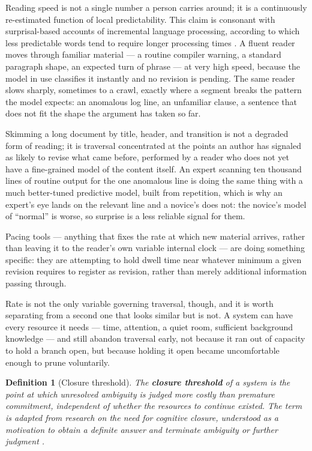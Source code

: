 \documentclass[11pt]{article}
\newtheorem{definition}{Definition}
\begin{document}
Reading speed is not a single number a person carries around; it is a continuously re-estimated function of local predictability. This claim is consonant with surprisal-based accounts of incremental language processing, according to which less predictable words tend to require longer processing times \citep{levy2008,wilcoxetal2023}. A fluent reader moves through familiar material --- a routine compiler warning, a standard paragraph shape, an expected turn of phrase --- at very high speed, because the model in use classifies it instantly and no revision is pending. The same reader slows sharply, sometimes to a crawl, exactly where a segment breaks the pattern the model expects: an anomalous log line, an unfamiliar clause, a sentence that does not fit the shape the argument has taken so far.

Skimming a long document by title, header, and transition is not a degraded form of reading; it is traversal concentrated at the points an author has signaled as likely to revise what came before, performed by a reader who does not yet have a fine-grained model of the content itself. An expert scanning ten thousand lines of routine output for the one anomalous line is doing the same thing with a much better-tuned predictive model, built from repetition, which is why an expert's eye lands on the relevant line and a novice's does not: the novice's model of ``normal'' is worse, so surprise is a less reliable signal for them.

Pacing tools --- anything that fixes the rate at which new material arrives, rather than leaving it to the reader's own variable internal clock --- are doing something specific: they are attempting to hold dwell time near whatever minimum a given revision requires to register as revision, rather than merely additional information passing through.

Rate is not the only variable governing traversal, though, and it is worth separating from a second one that looks similar but is not. A system can have every resource it needs --- time, attention, a quiet room, sufficient background knowledge --- and still abandon traversal early, not because it ran out of capacity to hold a branch open, but because holding it open became uncomfortable enough to prune voluntarily.

\begin{definition}[Closure threshold]
The \textbf{closure threshold} of a system is the point at which unresolved ambiguity is judged more costly than premature commitment, independent of whether the resources to continue existed. The term is adapted from research on the \emph{need for cognitive closure}, understood as a motivation to obtain a definite answer and terminate ambiguity or further judgment \citep{kruglanski1990,websterkruglanski1994}.
\end{definition}
\end{document}
